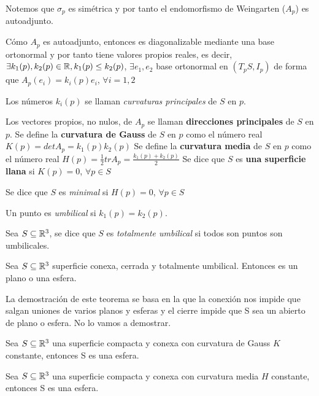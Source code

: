 Notemos que $\sigma_p$ es simétrica y por tanto el endomorfismo de Weingarten ($A_p$) es autoadjunto.

Cómo $A_p$ es autoadjunto, entonces es diagonalizable mediante una base ortonormal y por tanto tiene valores propios reales, es decir, $\exists k_1(p), k_2(p) \in \mathbb{R}, k_1(p) \leq k_2(p)$, $\exists {e_1,e_2}$ base ortonormal en $(T_pS, I_p)$ de forma que $A_p(e_i) = k_i(p)e_i$, $\forall i = 1,2$

\begin{definition}
Los números $k_i(p)$ se llaman \textit{curvaturas principales} de $S$ en $p$.
\end{definition}
Los vectores propios, no nulos, de $A_p$ se llaman \textbf{direcciones principales} de $S$ en $p$.
Se define la \textbf{curvatura de Gauss} de $S$ en $p$ como el número real $K(p)=det A_p=k_1(p)k_2(p)$
Se define la \textbf{curvatura media} de $S$ en $p$ como el número real $H(p)=\frac{1}{2}tr A_p=\frac{k_1(p)+k_2(p)}{2}$
Se dice que $S$ es \textbf{una superficie llana} si $K(p)=0$, $\forall p \in S$

\begin{definition}
Se dice que $S$ es \textit{minimal} si $H(p)=0$, $\forall p \in S$

Un punto es \textit{umbilical} si $k_1(p)=k_2(p)$.

Sea $S \subseteq \mathbb{R}^3$, se dice que $S$ es \textit{totalmente umbilical} si todos son puntos son umbilicales.
\end{definition}

\begin{theorem}\label{umbilicaltheorem}
Sea $S \subseteq \mathbb{R}^3$ superficie conexa, cerrada y totalmente umbilical. Entonces es un plano o una esfera.
\end{theorem}

La demostración de este teorema se basa en la que la conexión nos impide que salgan uniones de varios planos y esferas y el cierre impide que S sea un abierto de plano o esfera. No lo vamos a demostrar.

\begin{theorem}
Sea $S \subseteq \mathbb{R}^3$ una superficie compacta y conexa con curvatura de Gauss $K$ constante, entonces S es una esfera.
\end{theorem}


\begin{theorem}
Sea $S \subseteq \mathbb{R}^3$ una superficie compacta y conexa con curvatura media $H$ constante, entonces S es una esfera.
\end{theorem}

